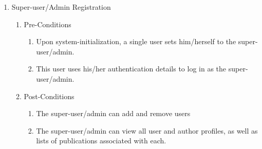 \documentclass{article} %
\begin{document}
	\noindent  
	
	\begin{enumerate}
		\item  Super-user/Admin Registration
		
		\begin{enumerate}
			\item  Pre-Conditions
			
			\begin{enumerate}
				\item  Upon system-initialization, a single user sets him/herself to the super-user/admin.
				
				\item  This user uses his/her authentication details to log in as the super-user/admin.
			\end{enumerate}
			
			\item  Post-Conditions
			
			\begin{enumerate}
				\item  The super-user/admin can add and remove users
				
				\item  The super-user/admin can view all user and author profiles, as well as lists of publications associated with each.
			\end{enumerate}
		\end{enumerate}
	\end{enumerate}
	
	\noindent  
	
\end{document}
